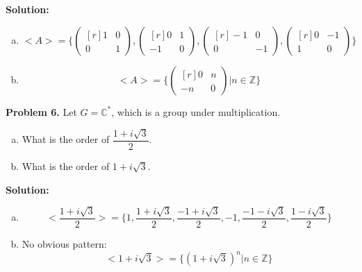 \documentclass[12pt, letterpaper]{article}
\newenvironment{problem}
    [1]
    {\noindent \textbf{Problem #1.}}
    {\vspace{3mm}}
\newenvironment{solution}
    [0]
    {\noindent \textbf{Solution:}} 
    {\vspace{3mm}}
\begin{document}
\begin{solution}
    \begin{enumerate}[(a)]
        \item 
        $$
        {<}A{>} = \{
            \begin{pmatrix*}[r] 1 & 0 \\ 0 & 1 \end{pmatrix*}, 
            \begin{pmatrix*}[r] 0 & 1 \\ -1 & 0 \end{pmatrix*}, 
            \begin{pmatrix*}[r] -1 & 0 \\ 0 & -1 \end{pmatrix*},
            \begin{pmatrix*}[r] 0 & -1 \\ 1 & 0 \end{pmatrix*}
        \}
        $$ 
        
        \item
        $$
        {<}A{>} = \{
            \begin{pmatrix*}[r] 0 & n \\ -n & 0 \end{pmatrix*} | n \in \mathbb{Z} 
        \}
        $$
    \end{enumerate}
\end{solution}

\begin{problem}{6}
    Let $G = \mathbb{C}^*$, which is a group under multiplication.
    \begin{enumerate}[(a)]
        \item What is the order of $\dfrac{1 + i\sqrt{3}}{2}$.
        \item What is the order of $1 + i\sqrt{3}$.
    \end{enumerate}
\end{problem}

\begin{solution}
    \begin{enumerate}[(a)]
        \item 
        $$
        {<}\dfrac{1 + i\sqrt{3}}{2}{>} = \{
            1,
            \dfrac{1 + i\sqrt{3}}{2},
            \dfrac{-1 + i\sqrt{3}}{2},
            -1,
            \dfrac{-1 - i\sqrt{3}}{2},
            \dfrac{1 - i\sqrt{3}}{2}
        \}
        $$

        \item No obvious pattern:
        $$
        {<}1 + i\sqrt{3}{>} = \{
            (1 + i\sqrt{3})^n | n \in \mathbb{Z}
        \}
        $$
    \end{enumerate}
\end{solution}
\end{document}
